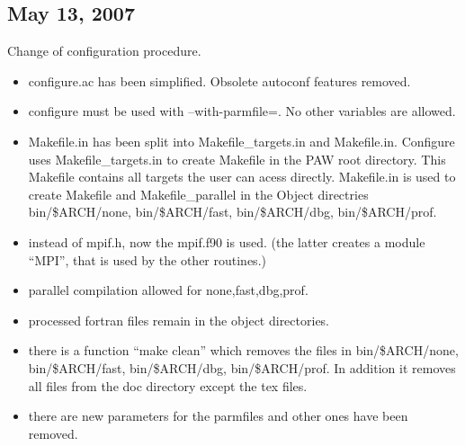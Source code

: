 \documentclass[final,12pt]{article}
\begin{document}
\subsection{May 13,  2007}

Change of configuration procedure.
\begin{itemize}
\item configure.ac has been simplified. Obsolete autoconf features removed.
\item configure must be used with --with-parmfile=. No other variables
  are allowed.
\item Makefile.in has been split into Makefile\_targets.in and
  Makefile.in. Configure uses Makefile\_targets.in to create Makefile
  in the PAW root directory. This Makefile contains all targets the
  user can acess directly. Makefile.in is used to create Makefile and
  Makefile\_parallel in the Object directries bin/\$ARCH/none,
  bin/\$ARCH/fast, bin/\$ARCH/dbg, bin/\$ARCH/prof.
\item instead of mpif.h, now the mpif.f90 is used. (the latter creates
  a module ``MPI'', that is used by the other routines.)
\item parallel compilation allowed for none,fast,dbg,prof.
\item processed fortran files remain in the object directories.
\item there is a function ``make clean'' which removes the files in
  bin/\$ARCH/none, bin/\$ARCH/fast, bin/\$ARCH/dbg, bin/\$ARCH/prof.
  In addition it removes all files from the doc directory except the
  tex files.
\item there are new parameters for the parmfiles and other ones have
  been removed.
\end{itemize}
   

\newpage


\end{document}
